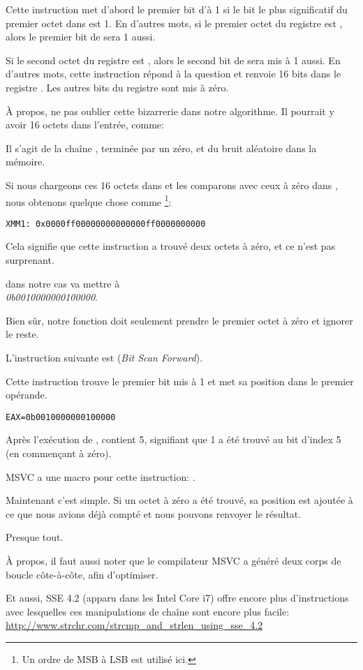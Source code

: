 Cette instruction met d'abord le premier bit d'\EAX à 1 si le bit le plus significatif
du premier octet dans  est 1.
En d'autres mots, si le premier octet du registre  est , alors le
premier bit de \EAX sera 1 aussi.

Si le second octet du registre  est , alors le second bit de \EAX
sera mis à 1 aussi.
En d'autres mots, cette instruction répond à la question  et renvoie
16 bits dans le registre \EAX.
Les autres bits du registre \EAX sont mis à zéro.

À propos, ne pas oublier cette bizarrerie dans notre algorithme.
Il pourrait y avoir 16 octets dans l'entrée, comme:



Il s'agit de la chaîne , terminée par un zéro, et du bruit aléatoire
dans la mémoire.

Si nous chargeons ces 16 octets dans  et les comparons avec ceux à zéro dans
, nous obtenons quelque chose comme \footnote{Un ordre de \ac{MSB} à \ac{LSB}
est utilisé ici.}:

\begin{verbatim}
XMM1: 0x0000ff00000000000000ff0000000000
\end{verbatim}

Cela signifie que cette instruction a trouvé deux octets à zéro, et ce n'est pas
surprenant.

 dans notre cas va mettre \EAX à\\
\emph{0b0010000000100000}.

Bien sûr, notre fonction doit seulement prendre le premier octet à zéro et ignorer
le reste.

\label{instruction_BSF}
L'instruction suivante est  (\emph{Bit Scan Forward}).

Cette instruction trouve le premier bit mis à 1 et met sa position dans le premier
opérande.

\begin{verbatim}
EAX=0b0010000000100000
\end{verbatim}

Après l'exécution de , \EAX contient 5, signifiant que 1 a été trouvé
au bit d'index 5 (en commençant à zéro).

MSVC a une macro pour cette instruction: .

Maintenant c'est simple. Si un octet à zéro a été trouvé, sa position est ajoutée
à ce que nous avions déjà compté et nous pouvons renvoyer le résultat.

Presque tout.

À propos, il faut aussi noter que le compilateur MSVC a généré deux corps de boucle
côte-à-côte, afin d'optimiser.

Et aussi, SSE 4.2 (apparu dans les Intel Core i7) offre encore plus d'instructions
avec lesquelles ces manipulations de chaîne sont encore plus facile: \url{http://www.strchr.com/strcmp_and_strlen_using_sse_4.2}
